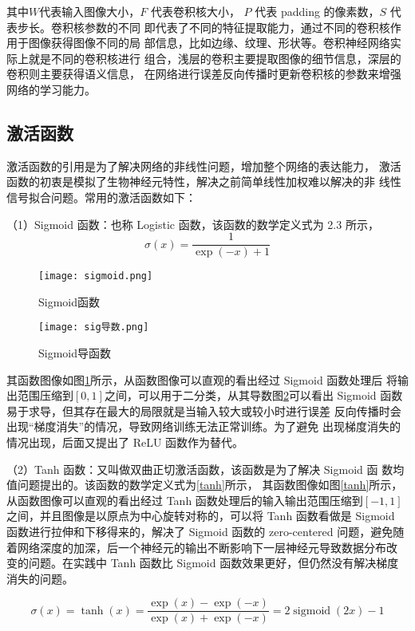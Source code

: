 其中$W$代表输入图像大小，$F$ 代表卷积核大小， $P$ 代表 padding 的像素数，$S$ 代表步长。卷积核参数的不同
即代表了不同的特征提取能力，通过不同的卷积核作用于图像获得图像不同的局
部信息，比如边缘、纹理、形状等。卷积神经网络实际上就是不同的卷积核进行
组合，浅层的卷积主要提取图像的细节信息，深层的卷积则主要获得语义信息，
在网络进行误差反向传播时更新卷积核的参数来增强网络的学习能力。

\subsection{激活函数}
激活函数的引用是为了解决网络的非线性问题，增加整个网络的表达能力，
激活函数的初衷是模拟了生物神经元特性，解决之前简单线性加权难以解决的非
线性信号拟合问题。常用的激活函数如下：

（1）Sigmoid 函数：也称 Logistic 函数，该函数的数学定义式为 2.3 所示，
\begin{equation}
    \sigma(x)=\frac{1}{\exp (-x)+1}
\end{equation}

\begin{figure}[htbp]
    \centering
    \texttt{[image: sigmoid.png]}
    \caption{Sigmoid函数}
    \label{sig}
\end{figure}

\begin{figure}[htbp]
    \centering
    \texttt{[image: sig导数.png]}
    \caption{Sigmoid导函数}
    \label{sigd}
\end{figure}

其函数图像如图\ref{sig}所示，从函数图像可以直观的看出经过 Sigmoid 函数处理后
将输出范围压缩到$[0,1]$之间，可以用于二分类，从其导数图\ref{sigd}可以看出
Sigmoid 函数易于求导，但其存在最大的局限就是当输入较大或较小时进行误差
反向传播时会出现“梯度消失”的情况，导致网络训练无法正常训练。为了避免
出现梯度消失的情况出现，后面又提出了 ReLU 函数作为替代。

（2）Tanh 函数：又叫做双曲正切激活函数，该函数是为了解决 Sigmoid 函
数均值问题提出的。该函数的数学定义式为\ref{tanh}所示，
其函数图像如图\ref{tanh}所示，
从函数图像可以直观的看出经过 Tanh 函数处理后的输入输出范围压缩到$[-1,1]$
之间，并且图像是以原点为中心旋转对称的，可以将 Tanh 函数看做是 Sigmoid
函数进行拉伸和下移得来的，解决了 Sigmoid 函数的 zero-centered 问题，避免随
着网络深度的加深，后一个神经元的输出不断影响下一层神经元导致数据分布改
变的问题。在实践中 Tanh 函数比 Sigmoid 函数效果更好，但仍然没有解决梯度
消失的问题。

\begin{equation}
    \sigma(x)=\tanh (x)=\frac{\exp (x)-\exp (-x)}{\exp (x)+\exp (-x)}=2 \operatorname{sigmoid}(2 x)-1
    \label{tan}
\end{equation}

